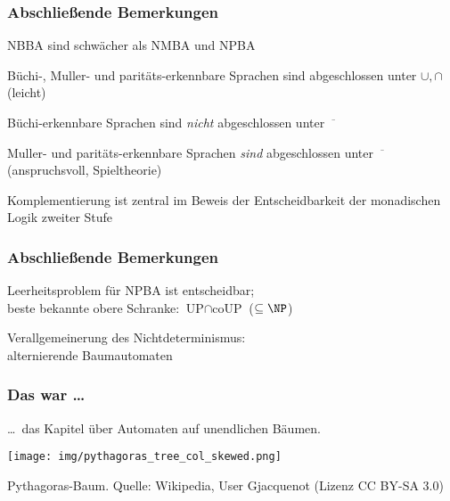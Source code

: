 \begin{frame}
  \frametitle{Abschließende Bemerkungen}

  \begin{Itemize}
    \item
      NBBA sind schwächer als NMBA und NPBA
    \item
      Büchi-, Muller- und paritäts-erkennbare Sprachen sind
      abgeschlossen unter $\cup,\cap$ (leicht)
    \item
      Büchi-erkennbare Sprachen sind \emph{nicht}
      abgeschlossen unter $\overline{\phantom{\circ}}$
    \item
      Muller- und paritäts-erkennbare Sprachen \emph{sind}
      abgeschlossen unter $\overline{\phantom{\circ}}$ (anspruchsvoll, Spieltheorie)
    \item
      Komplementierung ist zentral im Beweis der Entscheidbarkeit
      der monadischen Logik zweiter Stufe\hfill {\footnotesize {}}
  \end{Itemize}
  \note{~}
\end{frame}

\begin{frame}
  \frametitle{Abschließende Bemerkungen}

  \begin{Itemize}
    \item
      Leerheitsproblem für NPBA ist entscheidbar;\\
      beste bekannte obere Schranke: $\text{UP} \cap \text{coUP}$ ($\subseteq \NP$)
      \par%
    \item
      Verallgemeinerung des Nichtdeterminismus:\\
      alternierende Baumautomaten\hfill {\footnotesize {}}
  \end{Itemize}
  \note{~}
\end{frame}

\begin{frame}
  \frametitle{Das war \dots}
  \dots\ das Kapitel über Automaten auf unendlichen Bäumen.

  \par\bigskip
  \begin{center}
    \texttt{[image: img/pythagoras\_tree\_col\_skewed.png]}
    \par
    \begin{footnotesize}
      Pythagoras-Baum. Quelle: Wikipedia, User Gjacquenot (Lizenz CC BY-SA 3.0)
      \par
    \end{footnotesize}
  \end{center}
  \note{~}
\end{frame}

